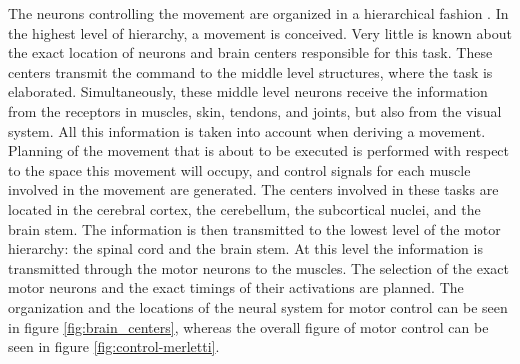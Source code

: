 The neurons controlling the movement are organized in a hierarchical fashion \citep{Widmaier2014}. In the highest level of hierarchy, a movement is conceived. Very little is known about the exact location of neurons and brain centers responsible for this task. These centers transmit the command to the middle level structures, where the task is elaborated. Simultaneously, these middle level neurons receive the information from the receptors in muscles, skin, tendons, and joints, but also from the visual system. All this information is taken into account when deriving a movement. Planning of the movement that is about to be executed is performed with respect to the space this movement will occupy, and control signals for each muscle involved in the movement are generated. The centers involved in these tasks are located in the cerebral cortex, the cerebellum, the subcortical nuclei, and the brain stem. The information is then transmitted to the lowest level of the motor hierarchy: the spinal cord and the brain stem. At this level the information is transmitted through the motor neurons to the muscles. The selection of the exact motor neurons and the exact timings of their activations are planned. The organization and the locations of the neural system for motor control can be seen in figure \ref{fig:brain_centers}, whereas the overall figure of motor control can be seen in figure \ref{fig:control-merletti}.

